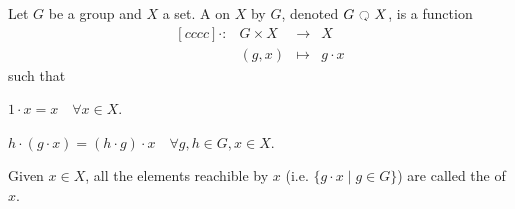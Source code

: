 \begin{definition}\label{def:group_action}
    Let $G$ be a group and $X$ a set. A  on $X$ by $G$, denoted $G \actson X$, is a function \[
        \begin{matrix}[cccc]
            \cdot: & G \times X & \to     & X         \\
                   & (g, x)     & \mapsto & g \cdot x
        \end{matrix}
    \] such that \begin{listo}
        \item $1 \cdot x = x \quad \forall x \in X$.
        \item $h \cdot (g \cdot x) = (h \cdot g) \cdot x \quad \forall g, h \in G, x \in X$.
    \end{listo}

    Given $x \in X$, all the elements reachible by $x$ (i.e. $\{ g \cdot x \mid g \in G \}$) are called the  of $x$.
\end{definition}

